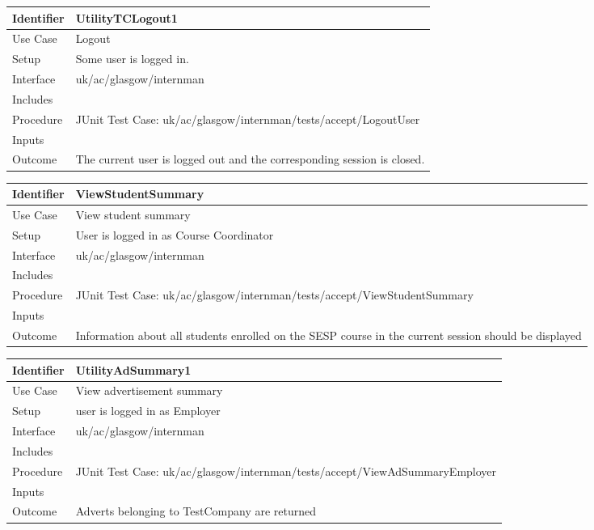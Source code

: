 \vspace{2em}

\begin{tabularx}{\textwidth}{|T|L|}
\hline
Identifier & UtilityTCLogout1\\
\hline
Use Case & Logout\\
\hline
Setup & Some user is logged in.\\
\hline
Interface & uk/ac/glasgow/internman\\
\hline
Includes &\\
\hline
Procedure & JUnit Test Case: uk/ac/glasgow/internman/tests/accept/LogoutUser\\
\hline
Inputs &\\
\hline
Outcome & The current user is logged out and the corresponding session is
closed.\\
\hline
\end{tabularx}

\vspace{2em}
\begin{tabularx}{\textwidth}{|T|L|}
\hline
Identifier & ViewStudentSummary\\
\hline
Use Case & View student summary\\
\hline
Setup & User is logged in as Course Coordinator\\
\hline
Interface & uk/ac/glasgow/internman\\
\hline
Includes &\\
\hline
Procedure & JUnit Test Case: uk/ac/glasgow/internman/tests/accept/ViewStudentSummary\\
\hline
Inputs &\\
\hline
Outcome & Information about all students enrolled on the SESP course in the current session should be displayed\\
\hline
\end{tabularx}

\vspace{2em}

\begin{tabularx}{\textwidth}{|T|L|}
\hline
Identifier & UtilityAdSummary1\\
\hline
Use Case & View advertisement summary\\
\hline
Setup & user is logged in as Employer\\
\hline
Interface & uk/ac/glasgow/internman\\
\hline
Includes &\\
\hline
Procedure & JUnit Test Case: uk/ac/glasgow/internman/tests/accept/ViewAdSummaryEmployer\\
\hline
Inputs &\\
\hline
Outcome & Adverts belonging to TestCompany are returned\\
\hline
\end{tabularx}

